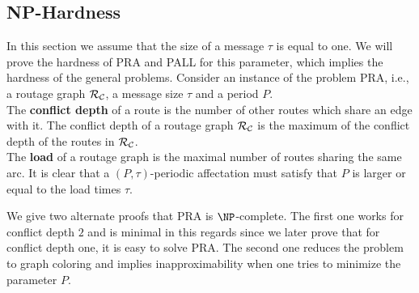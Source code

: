 \documentclass[a4paper,10pt]{article}
\begin{document}
  \subsection{NP-Hardness}

 In this section we assume that the size of a message $\tau$ is equal to one. 
 We will prove the hardness of PRA and PALL for this parameter, which implies the hardness of the general problems. 
Consider an instance of the problem PRA, i.e., a routage graph $\cal{R_{\cal C}}$, a message size $\tau$ and a period $P$. \\
The {\bf conflict depth} of a route is the number of other routes which share an edge with it. 
The conflict depth of a routage graph  $\cal{R_{\cal C}}$ is the maximum of the conflict depth of the routes in $\cal{R_{\cal C}}$.\\
The {\bf load} of a routage graph is the maximal number of routes sharing the same arc.
It is clear that a $(P,\tau)$-periodic affectation must satisfy that $P$ is larger or equal to the load times $\tau$.


We give two alternate proofs that PRA is $\NP$-complete.
The first one works for conflict depth $2$ and is minimal in this regards since we later prove that for conflict depth one,
it is easy to solve PRA. The second one reduces the problem to graph coloring and implies inapproximability when one tries to minimize the parameter $P$. \\
\end{document}
